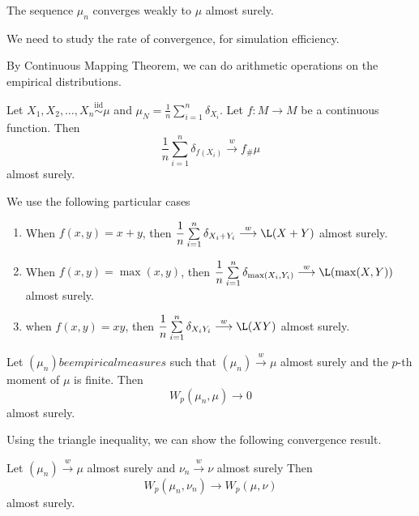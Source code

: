 \begin{theorem}[Varadarajan]
  The sequence $\mu_n$ converges weakly to $\mu$ almost surely.
\end{theorem}

\begin{remark}
  We need to study the rate of convergence, for simulation efficiency.
\end{remark}

By Continuous Mapping Theorem, we can do arithmetic operations on the empirical distributions.

\begin{proposition}
  Let $X_1, X_2, \ldots, X_n \overset{\text{iid}}{\sim} \mu$ and $\mu_N = \frac{1}{n} \sum_{i=1}^n \delta_{X_i}$. Let $f: M \to M$ be a continuous function. Then
  $$\dfrac{1}{n}\sum\limits_{i=1}^n \delta_{f(X_i)} \stackrel{w}{\longrightarrow} f_{\#}\mu$$
  almost surely.
\end{proposition}

We use the following particular cases

\begin{enumerate}
  \item When $f(x,y) = x + y$, then
        $\dfrac{1}{n}\sum\limits_{i=1}^n \delta_{X_i + Y_i} \stackrel{w}{\longrightarrow} \L(X+Y)$
        almost surely.
  \item When $f(x,y) = \max(x,y)$, then
        $\dfrac{1}{n}\sum\limits_{i=1}^n \delta_{\max(X_i, Y_i)} \stackrel{w}{\longrightarrow} \L(\max(X,Y))$
        almost surely.
  \item when $f(x,y) = xy$, then
        $\dfrac{1}{n}\sum\limits_{i=1}^n \delta_{X_i Y_i} \stackrel{w}{\longrightarrow} \L(XY)$
        almost surely.
\end{enumerate}

\begin{proposition}
  Let $(\mu_n) be empirical measures$ such that $(\mu_n) \stackrel{w}{\longrightarrow} \mu$ almost surely and the $p$-th moment of $\mu$ is finite. Then
  $$W_p(\mu_n, \mu) \to 0$$
  almost surely.
\end{proposition}

Using the triangle inequality, we can show the following convergence result.

\begin{proposition}
  \label{prop:Wasserstein_convergence}
  Let $(\mu_n) \stackrel{w}{\longrightarrow} \mu$ almost surely and $\nu_n \stackrel{w}{\longrightarrow} \nu$ almost surely Then
  $$W_p(\mu_n, \nu_n) \to W_p(\mu, \nu)$$
  almost surely.
\end{proposition}

